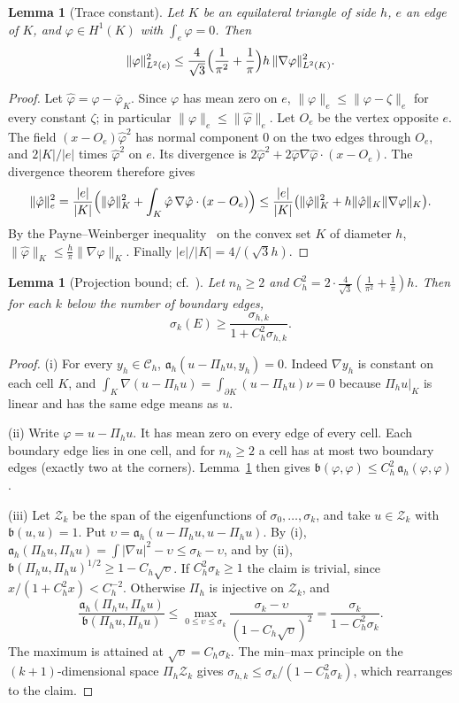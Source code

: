 \documentclass[11pt]{article}
\newtheorem{lemma}[theorem]{Lemma}
\theoremstyle{definition}
\theoremstyle{remark}
\begin{document}
\begin{lemma}[Trace constant]\label{lem:trace}
Let $K$ be an equilateral triangle of side $h$, $e$ an edge of $K$, and $\varphi\in H^1(K)$ with
$\int_e\varphi=0$. Then
\[\|\varphi\|^2_{L^2(e)}\le\frac{4}{\sqrt3}\Bigl(\frac1{\pi^2}+\frac1\pi\Bigr)h\,\|\nabla\varphi\|^2_{L^2(K)}.\]
\end{lemma}
\begin{proof}
Let $\hat\varphi=\varphi-\bar\varphi_K$. Since $\varphi$ has mean zero on $e$, $\|\varphi\|_e\le\|\varphi-\zeta\|_e$ for every
constant $\zeta$; in particular $\|\varphi\|_e\le\|\hat\varphi\|_e$. Let $O_e$ be the vertex opposite $e$. The
field $(x-O_e)\hat\varphi^2$ has normal component $0$ on the two edges through $O_e$, and $2|K|/|e|$ times
$\hat\varphi^2$ on $e$. Its divergence is $2\hat\varphi^2+2\hat\varphi\nabla\hat\varphi\cdot(x-O_e)$. The divergence
theorem therefore gives
\[\|\hat\varphi\|_e^2=\frac{|e|}{|K|}\Bigl(\|\hat\varphi\|_K^2+\int_K\hat\varphi\,\nabla\hat\varphi\cdot(x-O_e)\Bigr)
\le\frac{|e|}{|K|}\bigl(\|\hat\varphi\|_K^2+h\|\hat\varphi\|_K\|\nabla\varphi\|_K\bigr).\]
By the Payne--Weinberger inequality~\cite{PW,Beb} on the convex set $K$ of diameter $h$,
$\|\hat\varphi\|_K\le\frac h\pi\|\nabla\varphi\|_K$. Finally $|e|/|K|=4/(\sqrt3h)$.
\end{proof}

\begin{lemma}[Projection bound; cf.~\cite{Liu,YXL}]\label{lem:liu}
Let $n_h\ge2$ and $C_h^2=2\cdot\frac{4}{\sqrt3}(\frac1{\pi^2}+\frac1\pi)h$. Then for each $k$ below the number of
boundary edges,
\[\sigma_k(E)\ge\frac{\sigma_{h,k}}{1+C_h^2\sigma_{h,k}}.\]
\end{lemma}
\begin{proof}
(i) For every $y_h\in\mathcal C_h$, $\mathfrak a_h(u-\Pi_hu,y_h)=0$. Indeed $\nabla y_h$ is constant on each
cell $K$, and $\int_K\nabla(u-\Pi_hu)=\int_{\partial K}(u-\Pi_hu)\nu=0$ because $\Pi_hu|_K$ is linear and has
the same edge means as $u$.

(ii) Write $\varphi=u-\Pi_hu$. It has mean zero on every edge of every cell. Each boundary edge lies in one
cell, and for $n_h\ge2$ a cell has at most two boundary edges (exactly two at the corners). Lemma~\ref{lem:trace} then
gives $\mathfrak b(\varphi,\varphi)\le C_h^2\,\mathfrak a_h(\varphi,\varphi)$.

(iii) Let $\mathcal Z_k$ be the span of the eigenfunctions of $\sigma_0,\dots,\sigma_k$, and take
$u\in\mathcal Z_k$ with $\mathfrak b(u,u)=1$. Put $\upsilon=\mathfrak a_h(u-\Pi_hu,u-\Pi_hu)$. By (i),
$\mathfrak a_h(\Pi_hu,\Pi_hu)=\int|\nabla u|^2-\upsilon\le\sigma_k-\upsilon$, and by (ii),
$\mathfrak b(\Pi_hu,\Pi_hu)^{1/2}\ge1-C_h\sqrt\upsilon$. If $C_h^2\sigma_k\ge1$ the claim is trivial, since
$x/(1+C_h^2x)<C_h^{-2}$. Otherwise $\Pi_h$ is injective on $\mathcal Z_k$, and
\[\frac{\mathfrak a_h(\Pi_hu,\Pi_hu)}{\mathfrak b(\Pi_hu,\Pi_hu)}\le\max_{0\le\upsilon\le\sigma_k}\frac{\sigma_k-\upsilon}{(1-C_h\sqrt\upsilon)^2}=\frac{\sigma_k}{1-C_h^2\sigma_k}.\]
The maximum is attained at $\sqrt\upsilon=C_h\sigma_k$. The min--max principle on the $(k+1)$-dimensional space
$\Pi_h\mathcal Z_k$ gives $\sigma_{h,k}\le\sigma_k/(1-C_h^2\sigma_k)$, which rearranges to the claim.
\end{proof}
\end{document}
